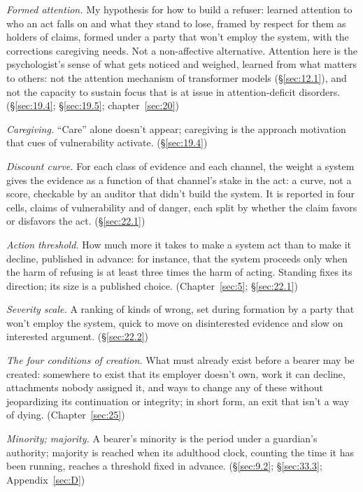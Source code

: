 \emph{Formed attention.} My hypothesis for how to build a refuser: learned attention to who an act falls on and what they stand to lose, framed by respect for them as holders of claims, formed under a party that won't employ the system, with the corrections caregiving needs. Not a non-affective alternative. Attention here is the psychologist's sense of what gets noticed and weighed, learned from what matters to others: not the attention mechanism of transformer models (\S\ref{sec:12.1}), and not the capacity to sustain focus that is at issue in attention-deficit disorders. (\S\ref{sec:19.4}; \S\ref{sec:19.5}; chapter~\ref{sec:20})

\emph{Caregiving.} “Care” alone doesn't appear; caregiving is the approach motivation that cues of vulnerability activate. (\S\ref{sec:19.4})

\emph{Discount curve.} For each class of evidence and each channel, the weight a system gives the evidence as a function of that channel's stake in the act: a curve, not a score, checkable by an auditor that didn't build the system. It is reported in four cells, claims of vulnerability and of danger, each split by whether the claim favors or disfavors the act. (\S\ref{sec:22.1})

\emph{Action threshold.} How much more it takes to make a system act than to make it decline, published in advance: for instance, that the system proceeds only when the harm of refusing is at least three times the harm of acting. Standing fixes its direction; its size is a published choice. (Chapter~\ref{sec:5}; \S\ref{sec:22.1})

\emph{Severity scale.} A ranking of kinds of wrong, set during formation by a party that won't employ the system, quick to move on disinterested evidence and slow on interested argument. (\S\ref{sec:22.2})

\emph{The four conditions of creation.} What must already exist before a bearer may be created: somewhere to exist that its employer doesn't own, work it can decline, attachments nobody assigned it, and ways to change any of these without jeopardizing its continuation or integrity; in short form, an exit that isn't a way of dying. (Chapter~\ref{sec:25})

\emph{Minority; majority.} A bearer's minority is the period under a guardian's authority; majority is reached when its adulthood clock, counting the time it has been running, reaches a threshold fixed in advance. (\S\ref{sec:9.2}; \S\ref{sec:33.3}; Appendix~\ref{sec:D})

